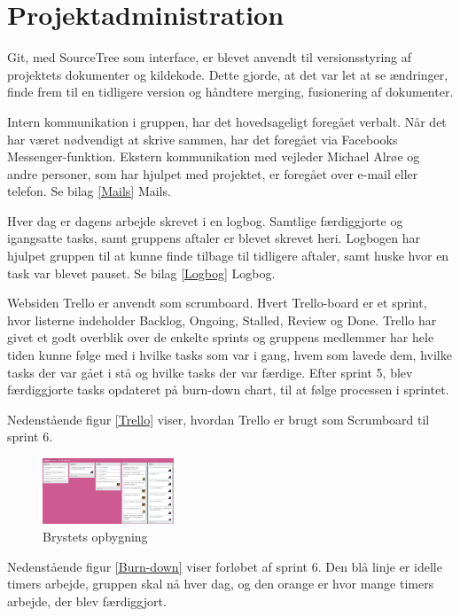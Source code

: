 \section{Projektadministration}
Git, med SourceTree som interface, er blevet anvendt til versionsstyring af projektets dokumenter og kildekode. Dette gjorde, at det var let at se ændringer, finde frem til en tidligere version og håndtere merging, fusionering af dokumenter.

Intern kommunikation i gruppen, har det hovedsageligt foregået verbalt. Når det har været nødvendigt at skrive sammen, har det foregået via Facebooks Messenger-funktion. Ekstern kommunikation med vejleder Michael Alrøe og andre personer, som har hjulpet med projektet, er foregået over e-mail eller telefon. Se bilag \ref{Mails} Mails.  

Hver dag er dagens arbejde skrevet i en logbog. Samtlige færdiggjorte og igangsatte tasks, samt gruppens aftaler er blevet skrevet heri. Logbogen har hjulpet gruppen til at kunne finde tilbage til tidligere aftaler, samt huske hvor en task var blevet pauset. Se bilag \ref{Logbog} Logbog.  

Websiden Trello er anvendt som scrumboard. Hvert Trello-board er et sprint, hvor listerne indeholder Backlog, Ongoing, Stalled, Review og Done. Trello har givet et godt overblik over de enkelte sprints og gruppens medlemmer har hele tiden kunne følge med i hvilke tasks som var i gang, hvem som lavede dem, hvilke tasks der var gået i stå og hvilke tasks der var færdige. Efter sprint 5, blev færdiggjorte tasks opdateret på burn-down chart, til at følge processen i sprintet. 

Nedenstående figur \ref{Trello} viser, hvordan Trello er brugt som Scrumboard til sprint 6. 

\begin{figure}[H]
    \centering
    \includegraphics[width=0.35\textwidth]{figurer/d/Trello}
    \caption{Brystets opbygning \citep{Trello}}
    \label{Trello som Scrumboard af sprint 6}
\end{figure}

Nedenstående figur \ref{Burn-down} viser forløbet af sprint 6. Den blå linje er idelle timers arbejde, gruppen skal nå hver dag, og den orange er hvor mange timers arbejde, der blev færdiggjort. 

